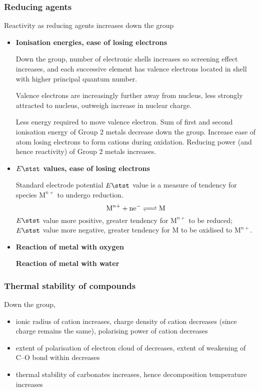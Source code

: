 \subsubsection{Reducing agents}
Reactivity as reducing agents increases down the group
\begin{itemize}
\item \textbf{Ionisation energies, ease of losing electrons}

Down the group, number of electronic shells increases so screening effect increases, and each successive element has valence electrons located in shell with higher principal quantum number.

Valence electrons are increasingly further away from nucleus, less strongly attracted to nucleus, outweigh increase in nuclear charge.

Less energy required to move valence electron. Sum of first and second ionisation energy of Group 2 metals decrease down the group. Increase ease of atom losing electrons to form cations during oxidation. Reducing power (and hence reactivity) of Group 2 metals increases.

\item \textbf{$E\stst$ values, ease of losing electrons}

Standard electrode potential $E\stst$ value is a measure of tendency for species $\mathrm{M}^{n+}$ to undergo reduction.
\[ \ce{M^{n+} + ne^- <=> M} \]
$E\stst$ value more positive, greater tendency for $\mathrm{M}^{n+}$ to be reduced; $E\stst$ value more negative, greater tendency for M to be oxidised to $\mathrm{M}^{n+}$.

\item \textbf{Reaction of metal with oxygen}

\textbf{Reaction of metal with water}
\end{itemize}

\subsubsection{Thermal stability of compounds}
Down the group,
\begin{itemize}
\item ionic radius of cation increases, charge density of cation decreases (since charge remains the same), polarising power of cation decreases
\item extent of polarisation of electron cloud of  decreases, extent of weakening of C--O bond within  decreases
\item thermal stability of carbonates increases, hence decomposition temperature increases
\end{itemize}

